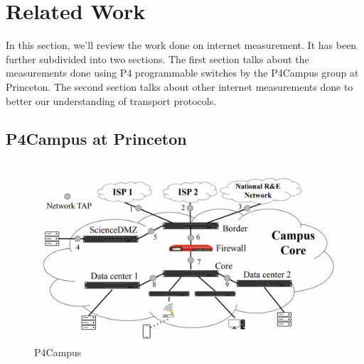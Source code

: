 
\chapter{Related Work} %

\label{Chapter2} %




In this section, we'll review the work done on internet measurement. It has been further subdivided into two sections. The first section talks about the measurements done using P4 programmable switches by the P4Campus group at Princeton. The second section talks about other internet measurements done to better our understanding of transport protocols.

\section{P4Campus at Princeton}

\begin{figure}[t]
    \centering
        \includegraphics[width=\textwidth]{Figures/image.png}
    \caption[P4Campus]{P4Campus ~\cite{p4campusprinceton}}
    \label{fig:p4camp}
    \bigskip
\end{figure}


